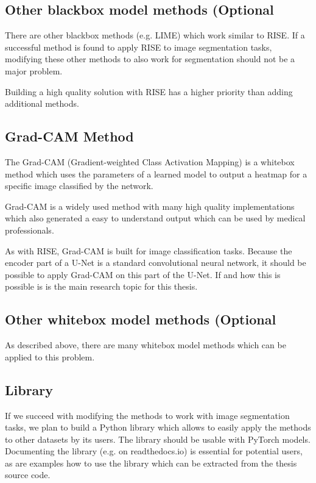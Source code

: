 \subsection{Other blackbox model methods (Optional}
There are other blackbox methods (e.g. LIME\cite{ribeiro2016should}) which work similar to RISE. If a successful method is found to apply RISE to image segmentation tasks, modifying these other methods to also work for segmentation should not be a major problem.

Building a high quality solution with RISE has a higher priority than adding additional methods.

\subsection{Grad-CAM Method}
The Grad-CAM\cite{selvaraju2017grad} (Gradient-weighted Class Activation Mapping) is a whitebox method which uses the parameters of a learned model to output a heatmap for a specific image classified by the network.

Grad-CAM is a widely used method with many high quality implementations which also generated a easy to understand output which can be used by medical professionals.

As with RISE, Grad-CAM is built for image classification tasks. Because the encoder part of a U-Net is a standard convolutional neural network, it should be possible to apply Grad-CAM on this part of the U-Net. If and how this is possible is is the main research topic for this thesis.

\subsection{Other whitebox model methods (Optional}
As described above, there are many whitebox model methods which can be applied to this problem.

\subsection{Library}
If we succeed with modifying the methods to work with image segmentation tasks, we plan to build a Python library which allows to easily apply the methods to other datasets by its users. The library should be usable with PyTorch models. Documenting the library (e.g. on readthedocs.io) is essential for potential users, as are examples how to use the library which can be extracted from the thesis source code.

